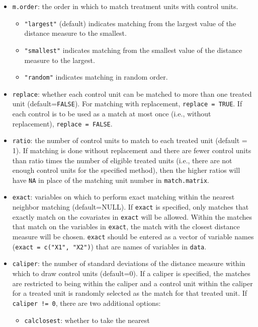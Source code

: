 \begin{itemize}
\item \texttt{m.order}: the order in which to match
  treatment units with control units.
  \begin{itemize}
  \item {\tt "largest"} (default) indicates matching from the largest value of
    the distance measure to the smallest. 
  \item {\tt "smallest"} indicates matching from the smallest value of
    the distance measure to the largest.
  \item {\tt "random"} indicates matching in random order.
  \end{itemize}
\item \texttt{replace}: whether each control unit can be
  matched to more than one treated unit (default=\texttt{FALSE}).  
  For matching with
  replacement, \texttt{replace = TRUE}.  If each control is to be used
  as a match at most once (i.e., without replacement), \texttt{replace
    = FALSE}. 
\item \texttt{ratio}: the number of control units to match to
  each treated unit (default = 1).  If matching is done
  without replacement and there are fewer control units than ratio
  times the number of eligible treated units (i.e., there are not
  enough control units for the specified method), then the higher
  ratios will have \texttt{NA} in place of the matching unit number in
  \texttt{match.matrix}.
\item \texttt{exact}: variables on which to perform exact matching
  within the nearest neighbor matching (default=NULL).  If
  \texttt{exact} is specified, only matches that exactly match on the
  covariates in \texttt{exact} will be allowed.  Within the matches
  that match on the variables in \texttt{exact}, the match with the
  closest distance measure will be chosen.  \texttt{exact} should be
  entered as a vector of variable names (\texttt{exact = c("X1",
    "X2")}) that are names of variables in \texttt{data}.
\item \texttt{caliper}: the number of standard deviations of the
  distance measure within which to draw control units (default=0).  If
  a caliper is specified, the matches are restricted to being within
  the caliper and a control unit within the caliper for a treated unit
  is randomly selected as the match for that treated unit.  If
  \texttt{caliper != 0}, there are two additional options:
  \begin{itemize} 
  \item \texttt{calclosest}: whether to take the nearest

\end{itemize}
\end{itemize}
